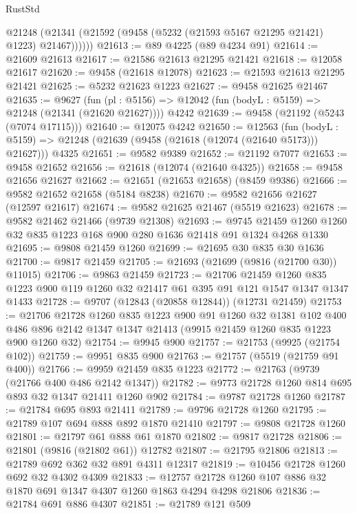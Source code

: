 \begin{lexlean}{RustStd}
\begin{coremodule}
        @21248 (@21341 (@21592 (@9458 (@5232 (@21593 @5167 @21295 @21421) @1223) @21467))))))
@21613 := @89 @4225 (@89 @4234 @91)
@21614 := @21609 @21613
@21617 := @21586 @21613 @21295 @21421
@21618 := @12058 @21617
@21620 := @9458 (@21618 @12078)
@21623 := @21593 @21613 @21295 @21421
@21625 := @5232 @21623 @1223
@21627 := @9458 @21625 @21467
@21635 := @9627
    (fun (pl : @5156) => @12042 (fun (bodyL : @5159) => @21248 (@21341 (@21620 @21627))))
    @4242
@21639 := @9458 (@21192 (@5243 (@7074 @17115)))
@21640 := @12075 @4242
@21650 := @12563
    (fun (bodyL : @5159) => @21248 (@21639 (@9458 (@21618 (@12074 (@21640 @5173))) @21627)))
    @4325
@21651 := @9582 @9389
@21652 := @21192 @7077
@21653 := @9458 @21652
@21656 := @21618 (@12074 (@21640 @4325))
@21658 := @9458 @21656 @21627
@21662 := @21651 (@21653 @21658) (@8459 @9386)
@21666 := @9582 @21652 @21658 (@5184 @8238)
@21670 := @9582 @21656 @21627 (@12597 @21617)
@21674 := @9582 @21625 @21467 (@5519 @21623)
@21678 := @9582 @21462 @21466 (@9739 @21308)
@21693 := @9745 @21459 @1260 @1260 @32 @835 @1223 @168 @900 @280 @1636 @21418 @91 @1324 @4268 @1330
@21695 := @9808 @21459 @1260
@21699 := @21695 @30 @835 @30 @1636
@21700 := @9817 @21459
@21705 := @21693 (@21699 (@9816 (@21700 @30)) @11015)
@21706 := @9863 @21459
@21723 := @21706
    @21459
    @1260
    @835
    @1223
    @900
    @119
    @1260
    @32
    @21417
    @61
    @395
    @91
    @121
    @1547
    @1347
    @1347
    @1433
@21728 := @9707 (@12843 (@20858 @12844)) (@12731 @21459)
@21753 := @21706
    @21728
    @1260
    @835
    @1223
    @900
    @91
    @1260
    @32
    @1381
    @102
    @400
    @486
    @896
    @2142
    @1347
    @1347
    @21413
    (@9915 @21459 @1260 @835 @1223 @900 @1260 @32)
@21754 := @9945 @900
@21757 := @21753 (@9925 (@21754 @102))
@21759 := @9951 @835 @900
@21763 := @21757 (@5519 (@21759 @91 @400))
@21766 := @9959 @21459 @835 @1223
@21772 := @21763 (@9739 (@21766 @400 @486 @2142 @1347))
@21782 := @9773 @21728 @1260 @814 @695 @893 @32 @1347 @21411 @1260 @902
@21784 := @9787 @21728 @1260
@21787 := @21784 @695 @893 @21411
@21789 := @9796 @21728 @1260
@21795 := @21789 @107 @694 @888 @892 @1870 @21410
@21797 := @9808 @21728 @1260
@21801 := @21797 @61 @888 @61 @1870
@21802 := @9817 @21728
@21806 := @21801 (@9816 (@21802 @61)) @12782
@21807 := @21795 @21806
@21813 := @21789 @692 @362 @32 @891 @4311 @12317
@21819 := @10456 @21728 @1260 @692 @32 @4302 @4309
@21833 := @12757 @21728 @1260 @107 @886 @32 @1870 @691 @1347 @4307 @1260 @1863 @4294 @4298 @21806
@21836 := @21784 @691 @886 @4307
@21851 := @21789
    @121
    @509

\end{coremodule}
\end{lexlean}
